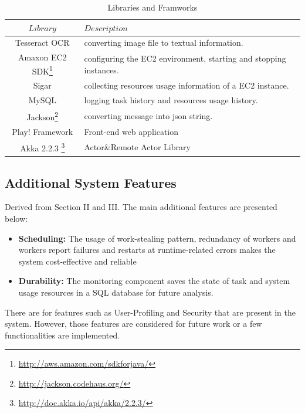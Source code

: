 \documentclass[conference]{IEEEtran}
\begin{document}
\begin{savenotes}
\begin{table}
\renewcommand{\arraystretch}{1.3}
\caption{Libraries and Framworks}\label{tab:syslib}
\centering
\begin{tabular*}{8cm}{c|p{5cm}}
    \hline
    $Library$&$Description$\\
    \hline
    Tesseract OCR \cite{tess} & converting image file to textual information. \\
    Amaxon EC2 SDK\footnote{\url{http://aws.amazon.com/sdkforjava/}}& configuring the EC2 environment, starting and stopping instances. \\
    Sigar & collecting resources usage information of a EC2 instance. \\
    MySQL  & logging task history and resources usage history. \\
    Jackson\footnote{\url{http://jackson.codehaus.org/}}  & converting message into json string. \\
    Play! Framework & Front-end web application \\
    Akka 2.2.3 \footnote{\url{http://doc.akka.io/api/akka/2.2.3/}} & Actor\&Remote Actor Library \\

    \hline
\end{tabular*}
\end{table}
\end{savenotes}

\subsection{Additional System Features}
\noindent
Derived from Section II and III. The main additional features are presented below:

\begin{itemize}
  \item \textbf{Scheduling:} The usage of work-stealing pattern, redundancy of workers and workers report failures and restarts at runtime-related errors makes the system cost-effective and reliable
  \item \textbf{Durability:} The monitoring component saves the state of task and system usage resources in a SQL database for future analysis.  
\end{itemize} 

There are for features such as User-Profiling and Security that are present in the system. However, those features are considered for future work or a few functionalities are implemented.  
\end{document}
